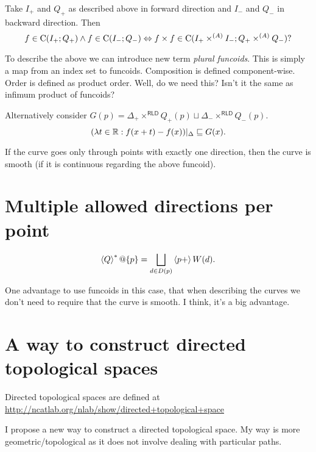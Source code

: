 Take $I_+$ and $Q_+$ as described above in forward direction and $I_-$ and $Q_-$ in backward direction. Then
\[ f\in\mathrm{C}(I_+;Q_+)\land f\in\mathrm{C}(I_-;Q_-) \Leftrightarrow f\times f\in\mathrm{C}(I_+\times^{(A)}I_-;Q_+\times^{(A)}Q_-)? \]

To describe the above we can introduce new term \emph{plural funcoids}. This is simply a map
from an index set to funcoids. Composition is defined component-wise. Order is defined as product order.
Well, do we need this? Isn't it the same as infimum product of funcoids?

Alternatively consider $G(p) = \Delta_+\times^{\mathsf{RLD}}Q_+(p) \sqcup \Delta_-\times^{\mathsf{RLD}}Q_-(p)$.
\[(\lambda t\in\mathbb{R}:f(x+t)-f(x))|_{\Delta} \sqsubseteq G(x). \]

\begin{conjecture}
If the curve goes only through points with exactly one direction, then the curve is smooth (if it is continuous regarding the above funcoid).
\end{conjecture}


\section{Multiple allowed directions per point}

\[ \left\langle Q\right\rangle ^{\ast}@\{p\} = \bigsqcup_{d\in D(p)} \left\langle p+\right\rangle W(d). \]

One advantage to use funcoids in this case, that when describing the curves we don't need to require that the curve is smooth. I think, it's a big advantage.

\section{A way to construct directed topological spaces}


Directed topological spaces are defined at\\
\url{http://ncatlab.org/nlab/show/directed+topological+space}

I propose a new way to construct a directed topological space. My way is more geometric/topological as it does not involve dealing with particular paths.

